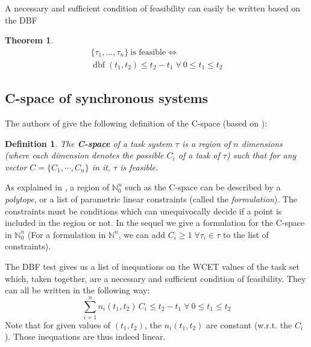\documentclass[conference]{IEEEtran}
\newtheorem{theorem}{Theorem}
\newtheorem{definition}{Definition}
\newcommand{\dbf}[1]{\operatorname{dbf}(#1)}
\begin{document}
		A necessary and sufficient condition of feasibility can easily be written
		based on the DBF \cite{baruah1999generalized}

		\begin{theorem}
			\begin{equation}
				\begin{array}{c}
					\{\tau_1, ..., \tau_n\} \: \text{is feasible}  \iff \\
					\dbf{t_1, t_2} \leq t_2 - t_1 \; \forall \: 0 \leq t_1 \leq t_2
				\end{array}
			\end{equation}
		\end{theorem}

	\subsection{C-space of synchronous systems}
	\label{sct:cspaceDescr}


			The authors of \cite{george2009characterization} give the following definition of the C-space (based on \cite{bini2004schedulability}):
			\begin{definition}
				The \textbf{C-space} of a task system $\tau$ is a region of $n$ dimensions (where each dimension denotes the possible $C_i$ of a task of $\tau$) such that for any vector $C = \{ C_1, \cdots, C_{n}\}$ in it, $\tau$ is feasible.
			\end{definition}

			As explained in \cite{nemhauser1988integer}, a region of $\mathbb{N}_0^n$
			such as the C-space can be described by a \emph{polytope}, or a list of
			parametric linear constraints (called the \emph{formulation}). The
			constraints must be conditions which can unequivocally decide if a point is
			included in the region or not. In the sequel we give a formulation for the
			C-space in $\mathbb{N}_0^n$ (For a formulation in $\mathbb{N}^n$, we can add
			$C_i \geqslant 1 \; \forall \tau_i \in \tau$ to the list of constraints).

		The DBF test gives us a list of inequations on the WCET values of the task set
		which, taken together, are a necessary and sufficient condition of feasibility. They
		can all be written in the following way:
		\begin{equation}
			\sum_{i=1}^{n} n_i(t_1, t_2) \, C_i \leq t_2 - t_1 \; \forall \: 0 \leq t_1 \leq t_2
		\end{equation}
		Note that for given values  of $(t_1, t_2)$, the $n_i(t_1, t_2)$ are
		constant (w.r.t. the $C_i$). Those inequations are thus indeed linear.
\end{document}
